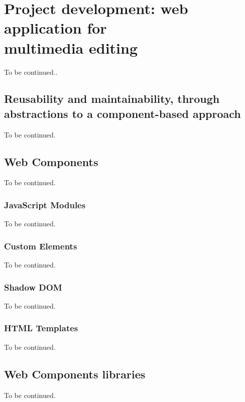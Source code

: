 \chapter{Project development: web application for \\ multimedia editing}
\label{ch:ch3_ProjectDevelopment}


To be continued..

\section{Reusability and maintainability, through abstractions to a component-based approach}

To be continued.

\section{Web Components}

To be continued.

\subsection{JavaScript Modules}

To be continued.

\subsection{Custom Elements}

To be continued.

\subsection{Shadow DOM}

To be continued.

\subsection{HTML Templates}

To be continued.

\section{Web Components libraries}

To be continued.

